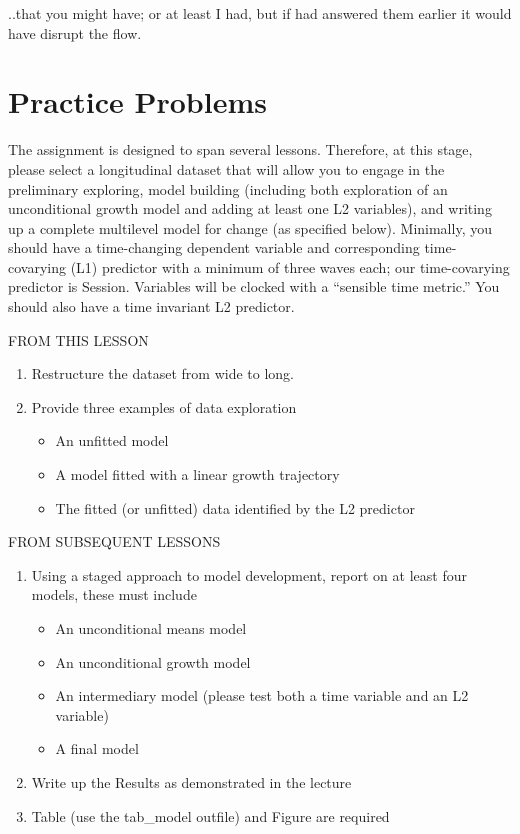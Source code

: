 \documentclass[
  11pt,
]{book}
\providecommand{\tightlist}{%
  \setlength{\itemsep}{0pt}\setlength{\parskip}{0pt}}
\begin{document}
..that you might have; or at least I had, but if had answered them earlier it would have disrupt the flow.

\hypertarget{practice-problems-1}{%
\section{Practice Problems}\label{practice-problems-1}}

The assignment is designed to span several lessons. Therefore, at this stage, please select a longitudinal dataset that will allow you to engage in the preliminary exploring, model building (including both exploration of an unconditional growth model and adding at least one L2 variables), and writing up a complete multilevel model for change (as specified below). Minimally, you should have a time-changing dependent variable and corresponding time-covarying (L1) predictor with a minimum of three waves each; our time-covarying predictor is Session. Variables will be clocked with a ``sensible time metric.'' You should also have a time invariant L2 predictor.

FROM THIS LESSON

\begin{enumerate}
\def\labelenumi{\arabic{enumi}.}
\tightlist
\item
  Restructure the dataset from wide to long.
\item
  Provide three examples of data exploration

  \begin{itemize}
  \tightlist
  \item
    An unfitted model
  \item
    A model fitted with a linear growth trajectory
  \item
    The fitted (or unfitted) data identified by the L2 predictor
  \end{itemize}
\end{enumerate}

FROM SUBSEQUENT LESSONS

\begin{enumerate}
\def\labelenumi{\arabic{enumi}.}
\setcounter{enumi}{2}
\tightlist
\item
  Using a staged approach to model development, report on at least four models, these must include

  \begin{itemize}
  \tightlist
  \item
    An unconditional means model
  \item
    An unconditional growth model
  \item
    An intermediary model (please test both a time variable and an L2 variable)
  \item
    A final model
  \end{itemize}
\item
  Write up the Results as demonstrated in the lecture
\item
  Table (use the tab\_model outfile) and Figure are required
\end{enumerate}
\end{document}

